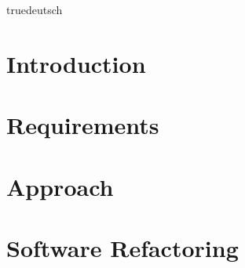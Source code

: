 \documentclass[a4paper,fleqn,english]{book}
\begin{document}

\zusammenfassung%
{truedeutsch} %
{} %
{} %





\mainmatter%
\pagestyle{fancy}%
\chapter{Introduction}

%
\chapter{Requirements}%
%
%
\chapter{Approach}%
%
%
\chapter{Software Refactoring} \label{sec:txtSoftwareRefactoring}%
%
%
\end{document}
